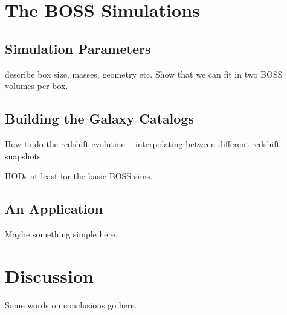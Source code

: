 \documentclass[usenatbib]{mn2e}
\begin{document}
\section{The BOSS Simulations}

\subsection{Simulation Parameters}

describe box size, masses, geometry etc. Show that we can fit in two BOSS
volumes per box. 

\subsection{Building the Galaxy Catalogs}

How to do the redshift evolution -- interpolating between different redshift
snapshots

HODs at least for the basic BOSS sims. 

\subsection{An Application}

Maybe something simple here.

\section{Discussion}

Some words on conclusions go here. 
\end{document}
